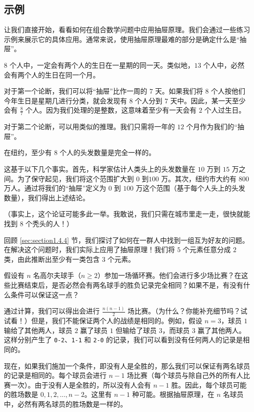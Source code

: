 
\subsection{示例}

让我们直接开始，看看如何在组合数学问题中应用抽屉原理。我们会通过一些练习示例来展示它的具体应用。通常来说，使用抽屉原理最难的部分是确定什么是``抽屉''。\\

\begin{example}
    $8$ 个人中，一定会有两个人的生日在一星期的同一天。类似地，$13$ 个人中，必然会有两个人的生日在同一个月。

    对于第一个论断，我们可以将``抽屉''比作一周的 $7$ 天。如果我们将 $8$ 个人按他们今年生日是星期几进行分类，就会发现有 $8$ 个人分到 $7$ 天中。因此，某一天至少会有 $\frac{8}{7}$ 个人。因为我们处理的是整数，这意味着至少有一天会有 $2$ 个人过生日。

    对于第二个论断，可以用类似的推理。我们只需将一年的 $12$ 个月作为我们的``抽屉''。
\end{example}

\begin{example}
    在纽约，至少有 $8$ 个人的头发数量是完全一样的。

    这基于以下几个事实。首先，科学家估计人类头上的头发数量在 $10$ 万到 $15$ 万之间。为了保守起见，我们将这个范围扩大到 $0$ 到$100$ 万。其次，纽约市大约有 $800$ 万人。通过将我们的``抽屉''定义为 $0$ 到 $100$ 万这个范围（基于每个人头上的头发数量），我们得出上述结论。

    （事实上，这个论证可能多此一举。我敢说，我们只需在城市里走一走，很快就能找到 $8$ 个秃头的人！）
\end{example}

\begin{example}
    回顾 \ref{sec:section1.4.4} 节，我们探讨了如何在一群人中找到一组互为好友的问题。在解决这个问题时，我们实际上应用了抽屉原理！我们将 $5$ 个元素任意分成 $2$ 类，由此推断出至少有一类包含 $3$ 个元素。
\end{example}

\begin{example}
    假设有 $n$ 名高尔夫球手（$n \ge 2$）参加一场循环赛。他们会进行多少场比赛？在这些比赛结束后，是否必然会有两名球手的胜负记录完全相同？如果不是，有没有什么条件可以保证这一点？

    通过计算，我们可以得出会进行 $\frac{n(n-1)}{2}$ 场比赛。（为什么？你能补充细节吗？试试看！）但是，我们不能保证两个人的战绩是相同的。例如，假设 $n = 3$，球员 $1$ 输给了其他两人，球员 $2$ 赢了球员 $1$ 但输给了球员 $3$，而球员 $3$ 赢了其他两人。这样分别产生了 \verb|0-2|、\verb|1-1| 和 \verb|2-0| 的记录，我们可以看到没有任何两人的记录是相同的。

    现在，如果我们施加一个条件，即没有人是全胜的，那么我们可以保证有两名球员的记录是相同的。每个球员会进行 $n-1$ 场比赛（每个球员与除自己外的所有人比赛一次）。由于没有人是全胜的，所以没有人会有 $n-1$ 胜。因此，每个球员可能的胜场数是 $0,1,2, \dots, n-2$。这里有 $n-1$ 种可能。根据抽屉原理，在 $n$ 名球员中，必然有两名球员的胜场数是一样的。
\end{example}

